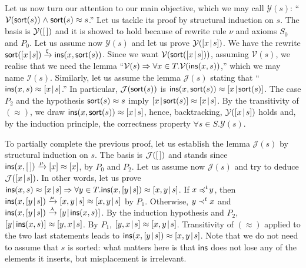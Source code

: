Let us now turn our attention to our main objective, which we may call
\(\mathcal{Y}(s)\): ``\(\mathcal{V}(\textsf{sort}(s)) \mathrel{\wedge}
\textsf{sort}(s) \approx s\).'' Let us tackle its proof by structural
induction on \(s\). The basis is \(\mathcal{Y}([\,])\) and it is showed
to hold because of rewrite rule \(\nu\) and axioms \(S_0\) and
\(P_0\). Let us assume now \(\mathcal{Y}(s)\) and let us prove
\(\mathcal{Y}([{x}\!\mid\!{s}])\). We have the rewrite
\(\textsf{sort}([{x}\!\mid\!{s}]) \xrightarrow{\smash{\xi}}
\textsf{ins}(x,\textsf{sort}(s))\). Since we want
\(\mathcal{V}(\textsf{sort}([{x}\!\mid\!{s}]))\), assuming \(\mathcal{V}(s)\),
we realise that we need the lemma ``\(\mathcal{V}(s) \Rightarrow
\forall x \in T.\mathcal{V}(\textsf{ins}(x,s))\),'' which we may name
\(\mathcal{I}(s)\). Similarly, let us assume the lemma
\(\mathcal{J}(s)\) stating that ``\(\textsf{ins}(x,s) \approx
[{x}\!\mid\!{s}]\).''  In particular, \(\mathcal{J}(\textsf{sort}(s))\) is
\(\textsf{ins}(x,\textsf{sort}(s)) \approx [{x}\!\mid\!{\textsf{sort}(s)}]\). The
case \(P_2\) and the hypothesis \(\textsf{sort}(s) \approx s\) imply
\([{x}\!\mid\!{\textsf{sort}(s)}] \approx [{x}\!\mid\!{s}]\). By the transitivity
of \((\approx)\), we draw \(\textsf{ins}(x,\textsf{sort}(s)) \approx
[{x}\!\mid\!{s}]\), hence, backtracking, \(\mathcal{Y}([{x}\!\mid\!{s}])\) holds
and, by the induction principle, the correctness property \(\forall s
\in S.\mathcal{Y}(s)\).

To partially complete the previous proof, let us establish the lemma
\(\mathcal{J}(s)\) by structural induction on \(s\). The basis is
\(\mathcal{J}([\,])\) and stands since \(\textsf{ins}(x,[\,])
\xrightarrow{\smash{\mu}} [x] \approx [x]\), by \(P_0\) and
\(P_2\). Let us assume now \(\mathcal{J}(s)\) and try to deduce
\(\mathcal{J}([{x}\!\mid\!{s}])\). In other words, let us prove
\(\textsf{ins}(x,s) \approx [{x}\!\mid\!{s}] \Rightarrow \forall y \in
T.\textsf{ins}(x,[{y}\!\mid\!{s}]) \approx [{x,y}\!\mid\!{s}]\). If \(x \mathrel{\preccurlyeq^t\!}
y\), then \(\textsf{ins}(x,[{y}\!\mid\!{s}]) \xrightarrow{\smash{\mu}}
[{x,y}\!\mid\!{s}] \approx [{x,y}\!\mid\!{s}]\) by \(P_1\). Otherwise, \(y
\mathrel{\prec^t} x\) and \(\textsf{ins}(x,[{y}\!\mid\!{s}])
\xrightarrow{\smash{\lambda}} [{y}\!\mid\!{\textsf{ins}(x,s)}]\). By the
induction hypothesis and \(P_2\), \([{y}\!\mid\!{\textsf{ins}(x,s)}] \approx
[{y,x}\!\mid\!{s}]\). By \(P_1\), \([{y,x}\!\mid\!{s}] \approx
[{x,y}\!\mid\!{s}]\). Transitivity of \((\approx)\) applied to the two last
statements leads to \(\textsf{ins}(x,[{y}\!\mid\!{s}]) \approx
[{x,y}\!\mid\!{s}]\). Note that we do not need to assume that \(s\) is
sorted: what matters here is that \(\textsf{ins}\) does not lose any of
the elements it inserts, but misplacement is irrelevant.

